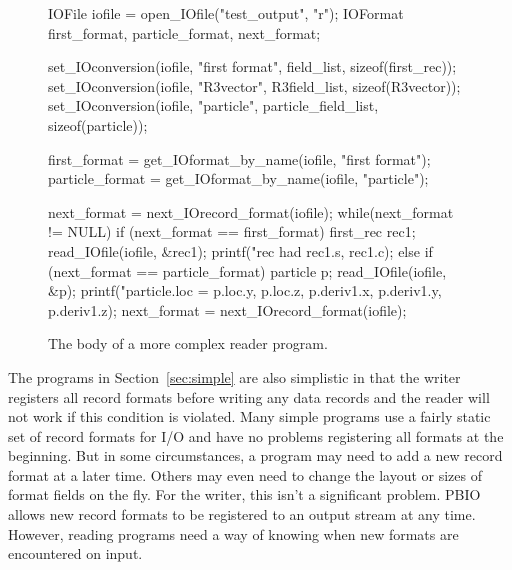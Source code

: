 \begin{figure}
\begin{Code}
    IOFile iofile = open_IOfile("test_output", "r");
    IOFormat first_format, particle_format, next_format;

    set_IOconversion(iofile, "first format", field_list, sizeof(first_rec));
    set_IOconversion(iofile, "R3vector", R3field_list, sizeof(R3vector));
    set_IOconversion(iofile, "particle", particle_field_list, sizeof(particle));

    first_format = get_IOformat_by_name(iofile, "first format");
    particle_format = get_IOformat_by_name(iofile, "particle");

    next_format = next_IOrecord_format(iofile);
    while(next_format != NULL) {
        if (next_format == first_format) {
            first_rec rec1;
            read_IOfile(iofile, &rec1);
            printf("rec had %
                   rec1.s, rec1.c);
        } else if (next_format == particle_format) {
            particle p;
            read_IOfile(iofile, &p);
            printf("particle.loc = %
                   p.loc.y, p.loc.z, p.deriv1.x, p.deriv1.y, p.deriv1.z); 
        }
        next_format = next_IOrecord_format(iofile);
    }
\end{Code}
\caption{The body of a more complex reader program.\label{fig:complexread}}
\end{figure}

The programs in Section~\ref{sec:simple} are also simplistic in that the
writer registers all record formats before writing any data records and the
reader will not work if this condition is violated.  Many simple programs
use a fairly static set of record formats for I/O and have no problems
registering all formats at the beginning.  But in some circumstances,
a program may need to add a new record format at a later time.  Others may
even need to change the layout or sizes of format fields on the fly.  For the
writer, this isn't a significant problem.  PBIO allows new record formats to
be registered to an output stream at any time.  However, reading programs
need a way of knowing when new formats are encountered on input.  


